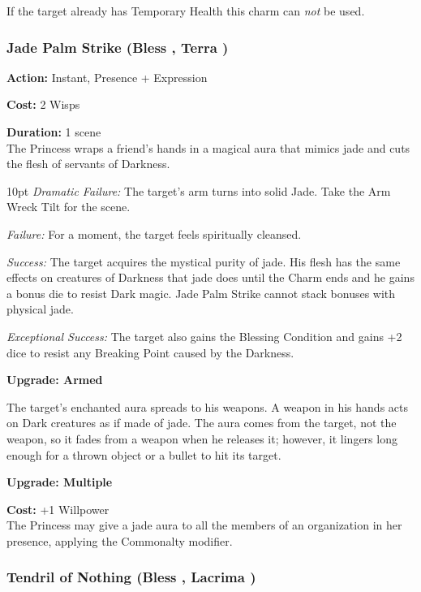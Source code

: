 If the target already has Temporary Health this charm can \textit{not} be used. 

\subsubsection*{Jade Palm Strike (Bless \textbullet\textbullet\textbullet, Terra \textbullet\textbullet)}

\noindent \textbf{Action:} Instant, Presence + Expression

\noindent \textbf{Cost:} 2 Wisps

\noindent \textbf{Duration:} 1 scene \\

The Princess wraps a friend's hands in a magical aura that mimics jade and cuts the flesh of servants of Darkness.

\begin{myindentpar}{10pt}    \emph{Dramatic Failure:} The target's arm turns into solid Jade. Take the Arm Wreck Tilt for the scene. 

    \emph{Failure:} For a moment, the target feels spiritually cleansed.

    \emph{Success:} The target acquires the mystical purity of jade. His flesh has the same effects on creatures of Darkness that jade does until the Charm ends and he gains a bonus die to resist Dark magic. Jade Palm Strike cannot stack bonuses with physical jade. 
    
    \emph{Exceptional Success:} The target also gains the Blessing Condition and gains +2 dice to resist any Breaking Point caused by the Darkness. 

\textbf{Upgrade: Armed}

The target's enchanted aura spreads to his weapons. A weapon in his hands acts on Dark creatures as if made of jade. The aura comes from the target, not the weapon, so it fades from a weapon when he releases it; however, it lingers long enough for a thrown object or a bullet to hit its target.

\textbf{Upgrade: Multiple}

\textbf{Cost:} +1 Willpower \\

The Princess may give a jade aura to all the members of an organization in her presence, applying the Commonalty modifier.\end{myindentpar}


\subsubsection*{Tendril of Nothing (Bless \textbullet\textbullet\textbullet\textbullet, Lacrima \textbullet\textbullet\textbullet)}

